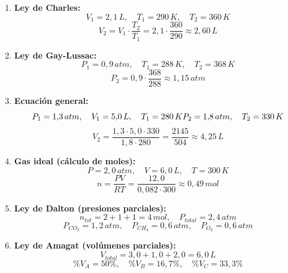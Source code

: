 \documentclass[a4paper,12pt]{article}
\begin{document}
\begin{enumerate}
\item \textbf{Ley de Charles:}
\[
V_1 = 2{,}1\,L,\quad T_1 = 290\,K,\quad T_2 = 360\,K
\]
\[
V_2 = V_1 \cdot \frac{T_2}{T_1} = 2{,}1 \cdot \frac{360}{290} \approx 2{,}60\,L
\]

\item \textbf{Ley de Gay-Lussac:}
\[
P_1 = 0{,}9\,atm,\quad T_1 = 288\,K,\quad T_2 = 368\,K
\]
\[
P_2 = 0{,}9 \cdot \frac{368}{288} \approx 1{,}15\,atm
\]

\item \textbf{Ecuación general:}
\[
P_1 = 1{,}3\,atm,\quad V_1 = 5{,}0\,L,\quad T_1 = 280\,K\\
P_2 = 1{,}8\,atm,\quad T_2 = 330\,K
\]
\[
V_2 = \frac{1{,}3 \cdot 5{,}0 \cdot 330}{1{,}8 \cdot 280} = \frac{2145}{504} \approx 4{,}25\,L
\]

\item \textbf{Gas ideal (cálculo de moles):}
\[
P = 2{,}0\,atm,\quad V = 6{,}0\,L,\quad T = 300\,K
\]
\[
n = \frac{PV}{RT} = \frac{12{,}0}{0{,}082 \cdot 300} \approx 0{,}49\,mol
\]

\item \textbf{Ley de Dalton (presiones parciales):}
\[
n_{tot} = 2 + 1 + 1 = 4\,mol,\quad P_{total} = 2{,}4\,atm
\]
\[
P_{CO_2} = 1{,}2\,atm,\quad P_{CH_4} = 0{,}6\,atm,\quad P_{O_2} = 0{,}6\,atm
\]

\item \textbf{Ley de Amagat (volúmenes parciales):}
\[
V_{total} = 3{,}0 + 1{,}0 + 2{,}0 = 6{,}0\,L
\]
\[
\%V_A = 50\%,\quad \%V_B = 16{,}7\%,\quad \%V_C = 33{,}3\%
\]

\end{enumerate}
\end{document}
